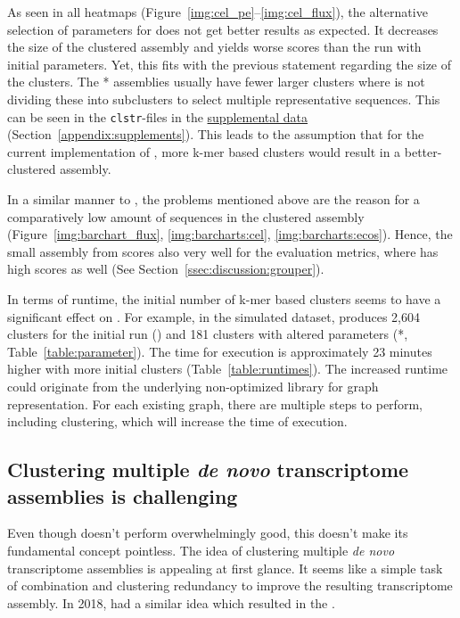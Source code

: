 \documentclass[12pt,a4paper,english]{article}
\begin{document}
	As seen in all heatmaps (Figure~\ref{img:cel_pe}--\ref{img:cel_flux}), the alternative selection of parameters for \karma does not get better results as expected. It decreases the size of the clustered assembly and yields worse scores than the run with initial parameters. Yet, this fits with the previous statement regarding the size of the clusters. The \karma{}* assemblies usually have fewer larger clusters where \mcl is not dividing these into subclusters to select multiple representative sequences. This can be seen in the \texttt{clstr}-files in the \href{https://github.com/lmfaber/master_thesis/blob/master/supplemental_data/clusterings/clusterings.txt}{supplemental data} (Section~\ref{appendix:supplements}). 
	This leads to the assumption that for the current implementation of \karma, more k-mer based clusters would result in a better-clustered assembly.
	
	In a similar manner to \grouper, the problems mentioned above are the reason for a comparatively low amount of sequences in the clustered assembly (Figure~\ref{img:barchart_flux}, \ref{img:barcharts:cel}, \ref{img:barcharts:ecos}). Hence, the small assembly from \karma scores also very well for the evaluation metrics, where \grouper has high scores as well (See Section~\ref{ssec:discussion:grouper}).
	
	In terms of runtime, the initial number of k-mer based clusters seems to have a significant effect on \karma. 
	For example, in the simulated dataset, \hdbscan produces 2,604 clusters for the initial run (\karma) and 181 clusters with altered parameters (\karma{}*, Table~\ref{table:parameter}). The time for execution is approximately 23 minutes higher with more initial clusters (Table~\ref{table:runtimes}). The increased runtime could originate from the underlying non-optimized library for graph representation. For each existing graph, there are multiple steps to perform, including \mcl clustering, which will increase the time of execution.
	
	\subsection{Clustering multiple \textit{de novo} transcriptome assemblies is challenging}
	Even though \karma doesn't perform overwhelmingly good, this doesn't make its fundamental concept pointless.
	The idea of clustering multiple \textit{de novo} transcriptome assemblies is appealing at first glance. It seems like a simple task of combination and clustering redundancy to improve the resulting transcriptome assembly. In 2018, \citeauthor{OysterRiverProtocol:18} had a similar idea which resulted in the \orp \citep{OysterRiverProtocol:18}.
	
\end{document}
